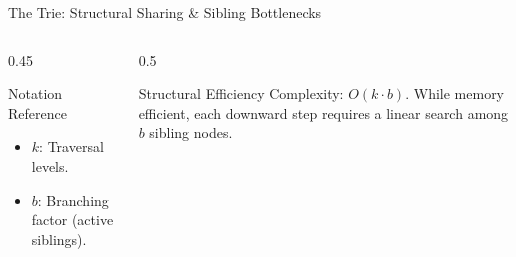 \begin{frame}[t]{The Trie: Structural Sharing \& Sibling Bottlenecks}
    \begin{columns}[T]
        \begin{column}{0.45\textwidth}
            \begin{alertblock}{Notation Reference}
                \scriptsize
                \begin{itemize}
                    \item \textbf{$k$}: Traversal levels.
                    \item \textbf{$b$}: Branching factor (active siblings).
                \end{itemize}
            \end{alertblock}
        \end{column}
        \begin{column}{0.5\textwidth}
            \begin{alertblock}{Structural Efficiency}
                \scriptsize
                Complexity: \textbf{$O(k \cdot b)$}. While memory efficient, each downward step requires a linear search among $b$ sibling nodes.
            \end{alertblock}
        \end{column}
    \end{columns}
\end{frame}

